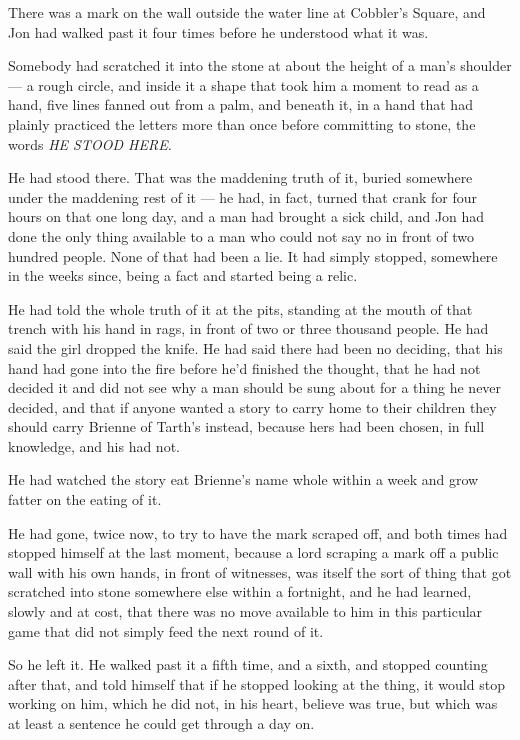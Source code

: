 There was a mark on the wall outside the water line at Cobbler’s Square, and Jon had walked past it four times before he understood what it was.

Somebody had scratched it into the stone at about the height of a man’s shoulder — a rough circle, and inside it a shape that took him a moment to read as a hand, five lines fanned out from a palm, and beneath it, in a hand that had plainly practiced the letters more than once before committing to stone, the words \textit{HE STOOD HERE.}

He had stood there. That was the maddening truth of it, buried somewhere under the maddening rest of it — he had, in fact, turned that crank for four hours on that one long day, and a man had brought a sick child, and Jon had done the only thing available to a man who could not say no in front of two hundred people. None of that had been a lie. It had simply stopped, somewhere in the weeks since, being a fact and started being a relic.

He had told the whole truth of it at the pits, standing at the mouth of that trench with his hand in rags, in front of two or three thousand people. He had said the girl dropped the knife. He had said there had been no deciding, that his hand had gone into the fire before he’d finished the thought, that he had not decided it and did not see why a man should be sung about for a thing he never decided, and that if anyone wanted a story to carry home to their children they should carry Brienne of Tarth’s instead, because hers had been chosen, in full knowledge, and his had not.

He had watched the story eat Brienne’s name whole within a week and grow fatter on the eating of it.

\sceneBreak

He had gone, twice now, to try to have the mark scraped off, and both times had stopped himself at the last moment, because a lord scraping a mark off a public wall with his own hands, in front of witnesses, was itself the sort of thing that got scratched into stone somewhere else within a fortnight, and he had learned, slowly and at cost, that there was no move available to him in this particular game that did not simply feed the next round of it.

So he left it. He walked past it a fifth time, and a sixth, and stopped counting after that, and told himself that if he stopped looking at the thing, it would stop working on him, which he did not, in his heart, believe was true, but which was at least a sentence he could get through a day on.


